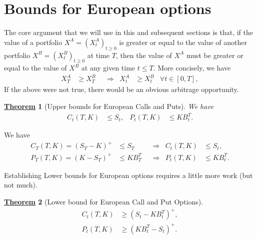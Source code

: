 \documentclass[12pt]{book}
\numberwithin{equation}{chapter}
\theoremstyle{plain}
\newtheorem{theorem}{\underline{Theorem}}
\numberwithin{theorem}{section}
\theoremstyle{definition}
\numberwithin{exercise}{chapter}
\let\oldendproof\endproof
\renewenvironment{proof}[1][\proofname]{%
  \oldproof[\scshape\underline{#1}]%
}{\oldendproof}
\newcommand{\<}{\langle}
\renewcommand{\>}{\rangle}
\renewcommand{\(}{\left(}
\renewcommand{\)}{\right)}
\renewcommand{\[}{\left[}
\renewcommand{\]}{\right]}
\theoremstyle{definition}
\numberwithin{question}{section}
\begin{document}
\section{Bounds for European options}
The core argument that we will use in this and subsequent sections is that, if the value of a portfolio $X^A = (X_t^A)_{t \geq 0}$ is greater or equal to the value of another portfolio $X^B = (X_t^B)_{t \geq 0}$ at time $T$, then the value of $X^A$ must be greater or equal to the value of $X^B$ at any given time $t \leq T$.  More concisely, we have
\begin{align} \label{eq:no_arb_geq}
X_T^A 
	&\geq X_T^B &
	&\Rightarrow&
X_t^A 
	&\geq X_t^B &
\forall t \in [0,T] ,
\end{align}
If the above were not true, there would be an obvious arbitrage opportunity.

\begin{theorem}[Upper bounds for European Calls and Puts]
We have
\begin{align}
C_t(T,K) 
	&\leq S_t , &
P_t(T,K) 
	&\leq K B_t^T .
\end{align}
\end{theorem}

\begin{proof}
We have
\begin{align}
C_T(T,K) = (S_T - K)^+ 
	&\leq S_T &
	&\Rightarrow& 
C_t(T,K) 
	&\leq S_t , \\
P_T(T,K) = (K - S_T)^+ 
	&\leq K B_T^T &
	&\Rightarrow&
P_t(T,K) 
	&\leq K B_t^T .
\end{align}
\end{proof}

\noindent
Establishing Lower bounds for European options requires a little more work (but not much).


\begin{theorem}[Lower bound for European Call and Put Options]
\begin{align}
C_t(T,K) 
	&\geq (S_t - K B_t^T)^+ , \label{eq:call-lower-bound} \\
P_t(T,K) 
	&\geq (K B_t^T - S_t )^+ .	\label{eq:put-lower-bound}
\end{align}
\end{theorem}
\end{document}
